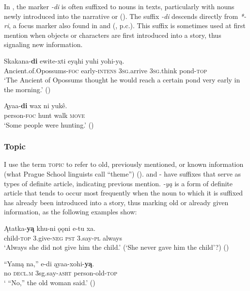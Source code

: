 \documentclass[output=paper]{LSP/langsci}
\begin{document}
In , the marker \emph{-di} is often suffixed to nouns in texts, particularly with nouns newly introduced into the narrative or  (\citealt[3]{Kaufman2011}). The suffix \emph{-di} descends directly from  \emph{*-ri}, a focus marker also found in  and  (\citealt[3]{Boyle2007}, p.c.). This suffix is sometimes used at first mention when objects or characters are first introduced into a story, thus signaling new information. 

\ea\label{possumpond}
\gll 	Skakana-\textbf{di} ewite-xti eyąhi yuhi yohi-y\k{a}. \\
	Ancient.of.Opossums-\textsc{foc} early-\textsc{intens} \textsc{3sg}.arrive \textsc{3sg}.think pond-\textsc{top}\\
\glt `The Ancient of Opossums thought he would reach a certain pond very early in the morning.' (\citealt[26]{DorseySwanton1912})
\z

\ea
\gll	Ąyaa-\textbf{di} wax ni yukê. \\
	person-\textsc{foc} hunt walk \textsc{move}\\
\glt `Some people were hunting.' (\citealt[65]{DorseySwanton1912})
\z

\subsubsection{Topic}

I use the term \textsc{topic} to refer to old, previously mentioned, or known information (what Prague School linguists call “theme”) (\citealt[271]{Payne1997}).  and - have suffixes that serve as types of definite article, indicating previous mention.  \emph{-yą} is a form of definite article that tends to occur most frequently when the noun to which it is suffixed has already been introduced into a story, thus marking old or already given information, as the following examples show: 

\ea
\gll	Ątatka-\textbf{yą } khu-ni 	 ǫǫni e-tu 	 xa.\\ 
child-\textsc{top} 3.give-\textsc{neg} \textsc{pst} 	 3.say-\textsc{pl} always \\
\glt `Always she did not give him the child.' (`She never gave him the child'?) (\citealt[43]{DorseySwanton1912})
\z

\ea
\gll	“Yamą na,” 	 e-di 	 ąyaa-xohi-\textbf{yą}.\\
	\hspace{.6em}no 	\textsc{decl.m} 3sg.say-\textsc{asrt} person-old-\textsc{top} \\
\glt ` ``No,'' the old woman said.' (\citealt[67]{DorseySwanton1912})
\z
\end{document}
